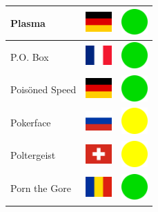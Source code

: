 \documentclass[12pt, a4paper, twoside]{report}
\begin{document}
\begin{center}
\begin{longtable}{|p{5cm}|p{2cm}|p{2cm}|}
 Plasma                                                     & \includegraphics[width=1cm]{../img/flags/de} &   \includegraphics[width=1cm]{../likes/y} \\ \hline
 P.O. Box                                                   & \includegraphics[width=1cm]{../img/flags/fr} &   \includegraphics[width=1cm]{../likes/y} \\ \hline
 Poisöned Speed                                             & \includegraphics[width=1cm]{../img/flags/de} &   \includegraphics[width=1cm]{../likes/y} \\ \hline
 Pokerface                                                  & \includegraphics[width=1cm]{../img/flags/ru} &   \includegraphics[width=1cm]{../likes/m} \\ \hline
 Poltergeist                                                & \includegraphics[width=1cm]{../img/flags/ch} &   \includegraphics[width=1cm]{../likes/m} \\ \hline
 Porn the Gore                                              & \includegraphics[width=1cm]{../img/flags/ro} &   \includegraphics[width=1cm]{../likes/y} \\ \hline

\end{longtable}
\end{center}
\end{document}
